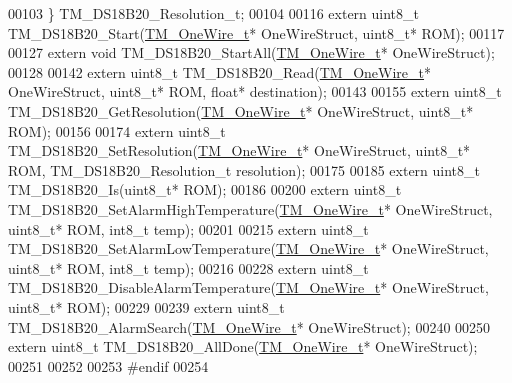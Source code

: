 \begin{DoxyCode}
00103 \} TM\_DS18B20\_Resolution\_t;
00104 
00116 \textcolor{keyword}{extern} uint8\_t TM\_DS18B20\_Start(\hyperlink{struct_t_m___one_wire__t}{TM\_OneWire\_t}* OneWireStruct, uint8\_t* ROM);
00117 
00127 \textcolor{keyword}{extern} \textcolor{keywordtype}{void} TM\_DS18B20\_StartAll(\hyperlink{struct_t_m___one_wire__t}{TM\_OneWire\_t}* OneWireStruct);
00128 
00142 \textcolor{keyword}{extern} uint8\_t TM\_DS18B20\_Read(\hyperlink{struct_t_m___one_wire__t}{TM\_OneWire\_t}* OneWireStruct, uint8\_t* ROM, \textcolor{keywordtype}{float}* destination);
00143 
00155 \textcolor{keyword}{extern} uint8\_t TM\_DS18B20\_GetResolution(\hyperlink{struct_t_m___one_wire__t}{TM\_OneWire\_t}* OneWireStruct, uint8\_t* ROM);
00156 
00174 \textcolor{keyword}{extern} uint8\_t TM\_DS18B20\_SetResolution(\hyperlink{struct_t_m___one_wire__t}{TM\_OneWire\_t}* OneWireStruct, uint8\_t* ROM, 
      TM\_DS18B20\_Resolution\_t resolution);
00175 
00185 \textcolor{keyword}{extern} uint8\_t TM\_DS18B20\_Is(uint8\_t* ROM);
00186 
00200 \textcolor{keyword}{extern} uint8\_t TM\_DS18B20\_SetAlarmHighTemperature(\hyperlink{struct_t_m___one_wire__t}{TM\_OneWire\_t}* OneWireStruct, uint8\_t* ROM, 
      int8\_t temp);
00201 
00215 \textcolor{keyword}{extern} uint8\_t TM\_DS18B20\_SetAlarmLowTemperature(\hyperlink{struct_t_m___one_wire__t}{TM\_OneWire\_t}* OneWireStruct, uint8\_t* ROM, 
      int8\_t temp);
00216 
00228 \textcolor{keyword}{extern} uint8\_t TM\_DS18B20\_DisableAlarmTemperature(\hyperlink{struct_t_m___one_wire__t}{TM\_OneWire\_t}* OneWireStruct, uint8\_t* ROM);
00229 
00239 \textcolor{keyword}{extern} uint8\_t TM\_DS18B20\_AlarmSearch(\hyperlink{struct_t_m___one_wire__t}{TM\_OneWire\_t}* OneWireStruct);
00240 
00250 \textcolor{keyword}{extern} uint8\_t TM\_DS18B20\_AllDone(\hyperlink{struct_t_m___one_wire__t}{TM\_OneWire\_t}* OneWireStruct);
00251 
00252 
00253 \textcolor{preprocessor}{#endif}
00254 
\end{DoxyCode}
